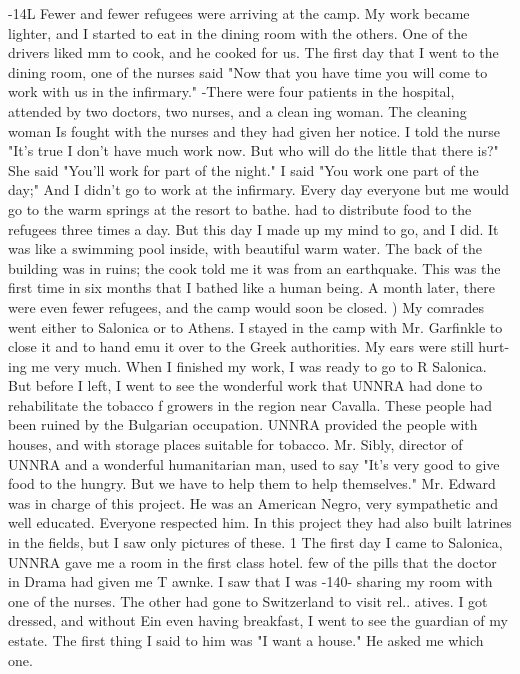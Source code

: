 -14L 
Fewer and fewer refugees were arriving at the camp. My work became lighter, and 
I started to eat in the dining room with the others. One of the drivers liked mm to 
cook, and he cooked for us. The first day that I went to the dining room, one of the 
nurses said "Now that you have time you will come to work with us in the infirmary." 
-There were four patients in the hospital, attended by two doctors, two nurses, and a clean 
ing woman. The cleaning woman Is fought with the nurses and they had given her notice. 
I told the nurse "It's true I don't have much work now. But who will do the little 
that there is?" She said "You'll work for part of the night." I said "You work one 
part of the day;" And I didn't go to work at the infirmary. 
Every day everyone but me would go to the warm springs at the resort to bathe. 
had to distribute food to the refugees three times a day. But this day I made up my 
mind to go, and I did. It was like a swimming pool inside, with beautiful warm water. The 
back of the building was in ruins; the cook told me it was from an earthquake. This was 
the first time in six months that I bathed like a human being. 
A month later, there were even fewer refugees, and the camp would soon be closed. 
) My comrades went either to Salonica or to Athens. I stayed in the camp with Mr. Garfinkle 
to close it and to hand emu it over to the Greek authorities. My ears were still hurt-
ing me very much. 
When I finished my work, I was ready to go to R Salonica. But before I left, I went 
to see the wonderful work that UNNRA had done to rehabilitate the tobacco f growers in the 
region near Cavalla. These people had been ruined by the Bulgarian occupation. UNNRA 
provided the people with houses, and with storage places suitable for tobacco. Mr. Sibly, 
director of UNNRA and a wonderful humanitarian man, used to say "It's very good to give 
food to the hungry. But we have to help them to help themselves." Mr. Edward was in 
charge of this project. He was an American Negro, very sympathetic and well educated. 
Everyone respected him. In this project they had also built latrines in the fields, 
but I saw only pictures of these. 
1 
The first day I came to Salonica, UNNRA gave me a room in the first class hotel. 
few of the pills that the doctor in Drama had given me 
T awnke. I saw that I was 
-140- 
sharing my room with one of the nurses. The other had gone to Switzerland to visit rel.. 
atives. 
I got dressed, and without Ein even having breakfast, I went to see the guardian of 
my estate. The first thing I said to him was "I want a house." He asked me which one. 

